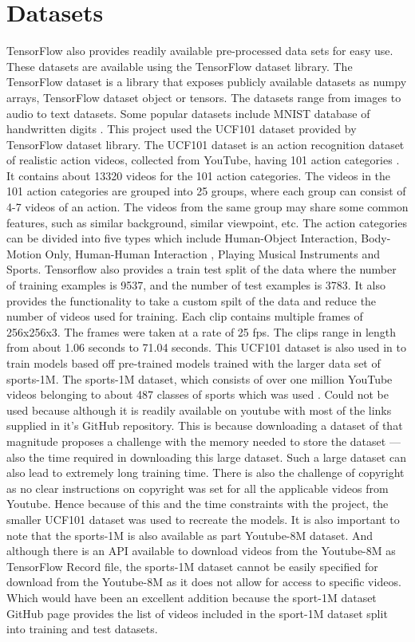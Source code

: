 \section{Datasets}
TensorFlow also provides readily available pre-processed data sets for easy use. These datasets are available using the TensorFlow dataset library. The TensorFlow dataset is a library that exposes publicly available datasets as numpy arrays, TensorFlow dataset object or tensors. The datasets range from images to audio to text datasets. Some popular datasets include MNIST database of handwritten digits \citep{6296535}. 
This project used the UCF101 dataset provided by TensorFlow dataset library. The UCF101 dataset is an action recognition dataset of realistic action videos, collected from YouTube, having 101 action categories \cite{soomro2012ucf101}. It contains about 13320 videos for the 101 action categories. The videos in the 101 action categories are grouped into 25 groups, where each group can consist of 4-7 videos of an action. The videos from the same group may share some common features, such as similar background, similar viewpoint, etc.
The action categories can be divided into five types which include Human-Object Interaction, Body-Motion Only, Human-Human Interaction , Playing Musical Instruments and Sports.
Tensorflow also provides a train test split of the data where the number of training examples is 9537, and the number of test examples is 3783.
It also provides the functionality to take a custom spilt of the data and reduce the number of videos used for training. Each clip contains multiple frames of 256x256x3. The frames were taken at a  rate of 25 fps. The clips range in length from about 1.06 seconds to  71.04 seconds.
This UCF101 dataset is also used in \citep{KarpathyCVPR14} to train models based off pre-trained models trained with the larger data set of sports-1M.
The  sports-1M dataset, which consists of over one million YouTube videos belonging to about 487 classes of sports which was used \citep{KarpathyCVPR14}. Could not be used because although it is readily available on youtube with most of the links supplied in it's GitHub repository.  This is because downloading a dataset of that magnitude proposes a challenge with the memory needed to store the dataset — also the time required in downloading this large dataset. Such a large dataset can also lead to extremely long training time. There is also the challenge of copyright as no clear instructions on copyright was set for all the applicable videos from Youtube. Hence because of this and the time constraints with the project, the smaller UCF101 dataset was used to recreate the models. It is also important to note that the sports-1M is also available as part Youtube-8M dataset. And although there is an API available to download videos from the Youtube-8M as TensorFlow Record file, the sports-1M dataset cannot be easily specified for download from the Youtube-8M as it does not allow for access to specific videos. Which would have been an excellent addition because the sport-1M dataset GitHub page provides the list of videos included in the sport-1M dataset split into training and test datasets.

